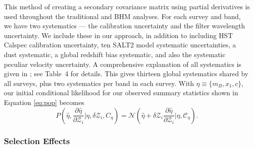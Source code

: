 \documentclass[a4paper,fleqn,usenatbib,manuscript]{emulateapj}
\newcommand{\cov}{\mathcal{C}_\eta}
\newcommand{\Z}{\mathcal{Z}}
\begin{document}
This method of creating a secondary covariance matrix using partial derivatives is used throughout the traditional and BHM analyses. For each survey and band, we have two systematics --- the calibration uncertainty and the filter wavelength uncertainty. We include these in our approach, in addition to including HST Calspec calibration uncertainty, ten SALT2 model systematic uncertainties, a dust systematic, a global redshift bias systematic, and also the systematic peculiar velocity uncertainty. A comprehensive explanation of all systematics is given in \citet{Brout18SYS}; see Table~4 for details. This gives thirteen global systematics shared by all surveys, plus two systematics per band in each survey. With $\eta \equiv \lbrace m_B, x_1, c \rbrace$, our initial conditional likelihood for our observed summary statistics shown in Equation \eqref{eq:pop} becomes
\begin{equation}
P\left(\hat{\eta}, \frac{\partial \hat{\eta}}{\partial \Z_i} | \eta, \delta \Z_i, C_\eta\right) = \mathcal{N}\left(\hat{\eta} + \delta \Z_i \frac{\partial \hat{\eta}}{\partial \Z_i}|\eta,\cov\right). \label{eq:l3}
\end{equation}




\subsubsection{Selection Effects}
\label{sec:selection}
\end{document}
